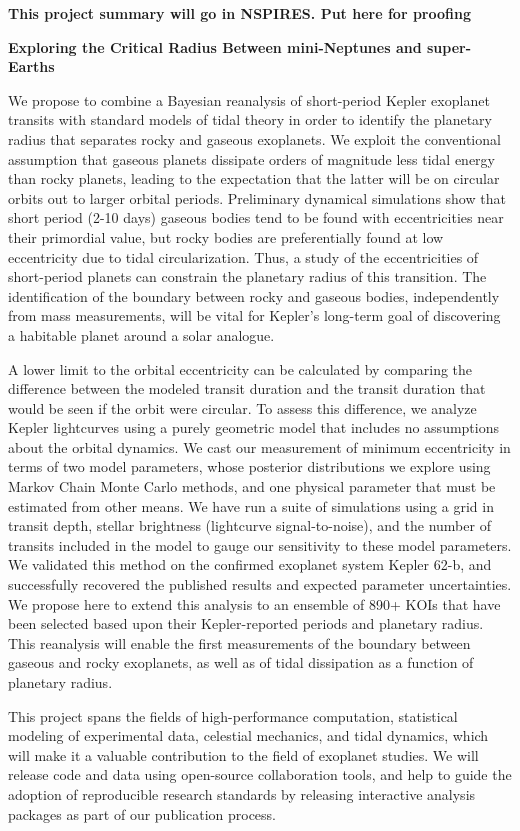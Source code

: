 \centerline{\bf This project summary will go in NSPIRES.  Put here for proofing} \medskip

\centerline{\bf Exploring the Critical Radius Between mini-Neptunes and super-Earths} \medskip

We propose to combine a Bayesian reanalysis of short-period Kepler
exoplanet transits with standard models of tidal theory in order to
identify the planetary radius that separates rocky and gaseous
exoplanets. We exploit the conventional assumption that gaseous
planets dissipate orders of magnitude less tidal energy than rocky
planets, leading to the expectation that the latter will be on
circular orbits out to larger orbital periods. Preliminary dynamical
simulations show that short period (2-10 days) gaseous bodies tend to
be found with eccentricities near their primordial value, but rocky
bodies are preferentially found at low eccentricity due to tidal
circularization.  Thus, a study of the eccentricities of short-period
planets can constrain the planetary radius of this transition.  The
identification of the boundary between rocky and gaseous bodies,
independently from mass measurements, will be vital for Kepler's
long-term goal of discovering a habitable planet around a solar
analogue.

A lower limit to the orbital eccentricity can be calculated by
comparing the difference between the modeled transit duration and the
transit duration that would be seen if the orbit were circular.  To
assess this difference, we analyze Kepler lightcurves using a purely
geometric model that includes no assumptions about the orbital
dynamics.  We cast our measurement of minimum eccentricity in terms of
two model parameters, whose posterior distributions we explore using
Markov Chain Monte Carlo methods, and one physical parameter that must
be estimated from other means.  We have run a suite of simulations
using a grid in transit depth, stellar brightness (lightcurve
signal-to-noise), and the number of transits included in the model to
gauge our sensitivity to these model parameters.
%
%
We validated this method on the confirmed exoplanet system Kepler
62-b, and successfully recovered the published results and expected
parameter uncertainties. We propose here to extend this analysis to an
ensemble of 890+ KOIs that have been selected based upon their
Kepler-reported periods and planetary radius.  This reanalysis will
enable the first measurements of the boundary between gaseous and
rocky exoplanets, as well as of tidal dissipation as a function of
planetary radius.

This project spans the fields of high-performance computation,
statistical modeling of experimental data, celestial mechanics, and
tidal dynamics, which will make it a valuable contribution to the
field of exoplanet studies.  We will release code and data using
open-source collaboration tools, and help to guide the adoption of
reproducible research standards by releasing interactive analysis
packages as part of our publication process.

